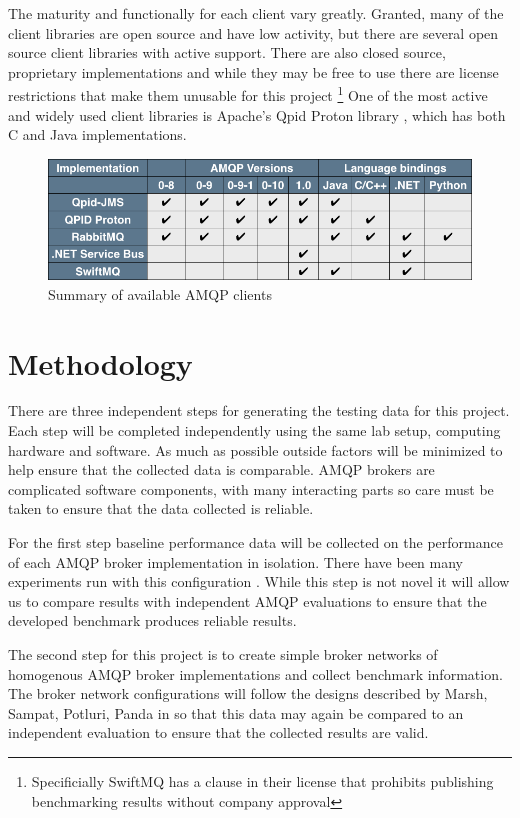 \documentclass{thesis}
\begin{document}
The maturity and functionally for each client vary greatly.  Granted, many of the client libraries are open source and have low activity, but there are several open source client libraries with active support.  There are also closed source, proprietary implementations and while they may be free to use there are license restrictions that make them unusable for this project \footnote{Specificially SwiftMQ has a clause in their license that prohibits publishing benchmarking results without company approval} One of the most active and widely used client libraries is Apache's Qpid Proton library \cite{QPID_PROTON}, which has both C and Java implementations.  

\begin{figure}
\centering
\vspace{2.0in} 
\includegraphics[scale=.5]{client_comparision}  
\caption{Summary of available AMQP clients}
\label{Figure 1}  
\end{figure}

\chapter{Methodology}
There are three independent steps for generating the testing data for this project.  Each step will be completed independently using the same lab setup, computing hardware and software.  As much as possible outside factors will be minimized to help ensure that the collected data is comparable.  AMQP brokers are complicated software components, with many interacting parts so care must be taken to ensure that the data collected is reliable.  

For the first step baseline performance data will be collected on the performance of each AMQP broker implementation in isolation.  There have been many experiments run with this configuration \cite{BENCHMARK1} \cite{BENCHMARK2}.  While this step is not novel it will allow us to compare results with independent AMQP evaluations to ensure that the developed benchmark produces reliable results. 

The second step for this project is to create simple broker networks of homogenous AMQP broker implementations and collect benchmark information.  The broker network configurations will follow the designs described by  Marsh, Sampat, Potluri, Panda in \cite{Scaling AMQP} so that this data may again be compared to an independent evaluation to ensure that the collected results are valid.
\end{document}
